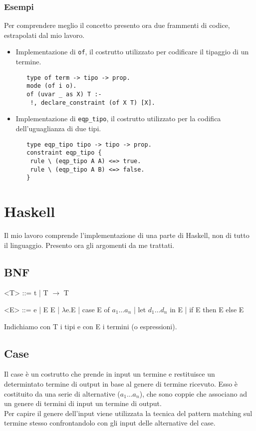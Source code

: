 \documentclass[12pt,a4paper,openright,twoside]{report}
\begin{document}
\subsubsection{Esempi}
Per comprendere meglio il concetto presento ora due frammenti di codice, estrapolati dal mio lavoro.\\
\begin{itemize}
 \item Implementazione di \verb"of", il costrutto utilizzato per codificare il tipaggio di un termine.
  \begin{verbatim}
   type of term -> tipo -> prop.
   mode (of i o).
   of (uvar _ as X) T :-
    !, declare_constraint (of X T) [X].
  \end{verbatim}
 \item Implementazione di \verb"eqp_tipo", il costrutto utilizzato per la codifica dell'uguaglianza di due tipi.
  \begin{verbatim}
   type eqp_tipo tipo -> tipo -> prop.
   constraint eqp_tipo {
    rule \ (eqp_tipo A A) <=> true.
    rule \ (eqp_tipo A B) <=> false.
   }
  \end{verbatim}
\end{itemize}

\section{Haskell}

Il mio lavoro comprende l'implementazione di una parte di Haskell, non di tutto il linguaggio. Presento ora gli argomenti da me trattati.

\subsection{BNF}
\begin{grammar}
 \let\syntleft\relax    %
 \let\syntright\relax   %
 <T> ::= t | T $\rightarrow$ T
 
 <E> ::= e | E E | $\lambda$e.E | case E of $a_1 \ldots a_n$ | let $d_1 \ldots d_n$ in E | if E then E else E
\end{grammar}
Indichiamo con T i tipi e con E i termini (o espressioni).

\subsection{Case}
Il case è un costrutto che prende in input un termine e restituisce un determintato termine di output in base al genere di termine ricevuto. Esso è costituito da una serie di alternative ($a_1 \ldots a_n$), che sono coppie che associano ad un genere di termini di input un termine di output.\\
Per capire il genere dell'input viene utilizzata la tecnica del pattern matching sul termine stesso confrontandolo con gli input delle alternative del case.
\end{document}
